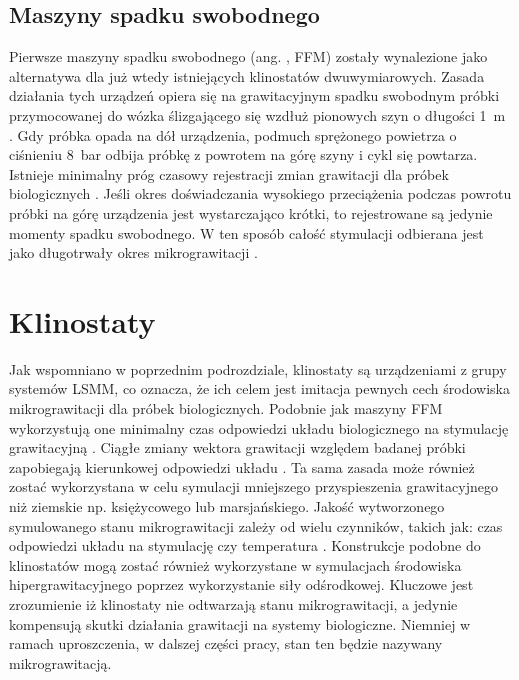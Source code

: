\subsection{Maszyny spadku swobodnego}

Pierwsze maszyny spadku swobodnego (ang. , FFM) zostały wynalezione jako alternatywa dla już wtedy
 istniejących klinostatów dwuwymiarowych. Zasada działania tych urządzeń opiera się na
  grawitacyjnym spadku swobodnym próbki przymocowanej do wózka ślizgającego się wzdłuż
   pionowych szyn o długości \SI{1}{m} \cite{bib:ffm_rpm}. Gdy próbka opada na dół
    urządzenia, podmuch sprężonego powietrza o ciśnieniu \SI{8}{bar} odbija próbkę z
     powrotem na górę szyny i cykl się powtarza. Istnieje minimalny próg czasowy
      rejestracji zmian grawitacji dla próbek biologicznych \cite{bib:ffm}. Jeśli okres
       doświadczania wysokiego przeciążenia podczas powrotu próbki na górę urządzenia
        jest wystarczająco krótki, to rejestrowane są jedynie momenty spadku swobodnego.
         W ten sposób całość stymulacji odbierana jest jako długotrwały okres
          mikrograwitacji \cite{bib:ffm}.

\section{Klinostaty} \label{klinostaty}

Jak wspomniano w poprzednim podrozdziale, klinostaty są urządzeniami z grupy systemów
 LSMM, co oznacza, że ich celem jest imitacja pewnych cech środowiska mikrograwitacji
  dla próbek biologicznych. Podobnie jak maszyny FFM wykorzystują one minimalny czas
   odpowiedzi układu biologicznego na stymulację
    grawitacyjną \cite{bib:klinostat_lafayette}. Ciągłe zmiany wektora grawitacji
     względem badanej próbki zapobiegają kierunkowej odpowiedzi
      układu \cite{bib:klinostat_lafayette}. Ta sama zasada może również zostać
       wykorzystana w celu symulacji mniejszego przyspieszenia grawitacyjnego niż
        ziemskie np. księżycowego lub marsjańskiego. Jakość wytworzonego symulowanego
         stanu mikrograwitacji zależy od wielu czynników, takich jak: czas odpowiedzi
          układu na stymulację czy temperatura \cite{bib:klinostat_lafayette}.
           Konstrukcje podobne do klinostatów mogą zostać również wykorzystane w
            symulacjach środowiska hipergrawitacyjnego poprzez wykorzystanie siły
             odśrodkowej. Kluczowe jest zrozumienie iż klinostaty nie odtwarzają stanu
              mikrograwitacji, a jedynie kompensują skutki działania grawitacji na
               systemy biologiczne. Niemniej w ramach uproszczenia, w dalszej części
                pracy, stan ten będzie nazywany mikrograwitacją.
                


